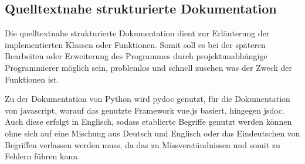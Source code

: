 \subsection{Quelltextnahe strukturierte Dokumentation}
Die quelltextnahe strukturierte Dokumentation dient zur Erläuterung der implementierten Klassen oder Funktionen. Somit soll es bei der späteren Bearbeiten oder Erweiterung des Programmes durch projektunabhängige Programmierer möglich sein, problemlos und schnell zusehen was der Zweck der Funktionen ist.

Zu der Dokumentation von Python wird pydoc genutzt, für die Dokumentation von javascript, worauf das genutzte Framework vue.js basiert, hingegen jsdoc. Auch diese erfolgt in Englisch, sodass etablierte Begriffe genutzt werden können ohne sich auf eine Mischung aus Deutsch und Englisch oder das Eindeutschen von Begriffen verlassen werden muss, da das zu Missverständnissen und somit zu Fehlern führen kann.